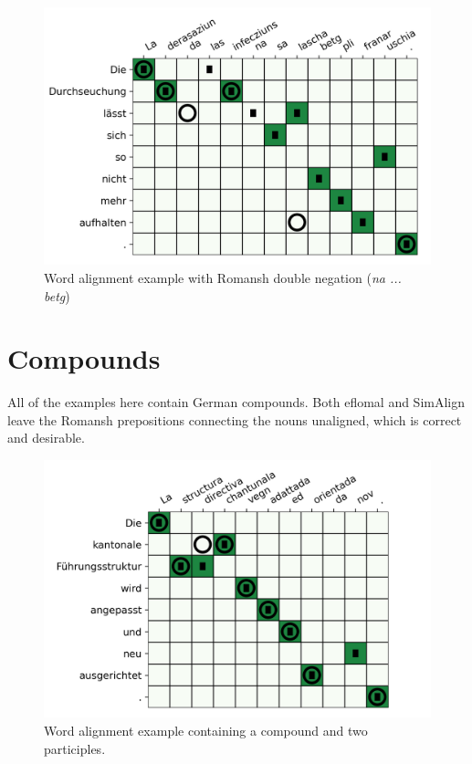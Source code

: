 \begin{figure}[ht]
\includegraphics{graphics/alignments/example6-na_betg.png}
\caption{Word alignment example with Romansh double negation (\emph{na ... 
betg})}
\label{fig:na-betg2}
\end{figure}

\section{Compounds}
All of the examples here contain German compounds. 
Both eflomal and SimAlign leave the Romansh prepositions connecting the nouns unaligned, which is correct and desirable.


\begin{figure}[ht]
\includegraphics{graphics/alignments/example4.png}
\caption{Word alignment example containing a compound and two participles.}
\end{figure}

